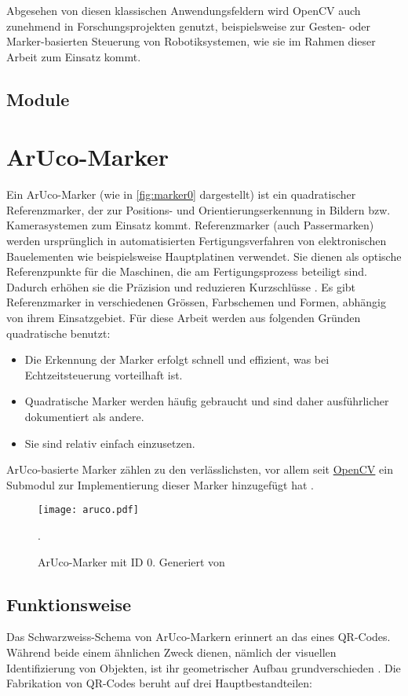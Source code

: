 Abgesehen von diesen klassischen Anwendungsfeldern wird OpenCV auch zunehmend in Forschungsprojekten genutzt, beispielsweise zur Gesten- oder Marker-basierten Steuerung von Robotiksystemen, wie sie im Rahmen dieser Arbeit zum Einsatz kommt. \cite{sse:foodDel}

\subsection{Module}

\section{ArUco-Marker}
Ein ArUco-Marker (wie in \autoref{fig:marker0} dargestellt) ist ein quadratischer Referenzmarker, der zur Positions- und Orientierungserkennung in Bildern bzw. Kamerasystemen zum Einsatz kommt. Referenzmarker (auch Passermarken) werden ursprünglich in automatisierten Fertigungsverfahren von elektronischen Bauelementen wie beispielsweise Hauptplatinen verwendet. Sie dienen als optische Referenzpunkte für die Maschinen, die am Fertigungsprozess beteiligt sind. Dadurch erhöhen sie die Präzision und reduzieren Kurzschlüsse \cite{Wiki:Passermarke}.
Es gibt Referenzmarker in verschiedenen Grössen, Farbschemen und Formen, abhängig von ihrem Einsatzgebiet. Für diese Arbeit werden aus folgenden Gründen quadratische benutzt:

\begin{itemize}
    \item Die Erkennung der Marker erfolgt schnell und effizient, was bei Echtzeitsteuerung vorteilhaft ist.
    \item Quadratische Marker werden häufig gebraucht und sind daher ausführlicher dokumentiert als andere.
    \item Sie sind relativ einfach einzusetzen.
\end{itemize}

ArUco-basierte Marker zählen zu den verlässlichsten, vor allem seit \hyperref[sec:ocv]{OpenCV} ein Submodul zur Implementierung dieser Marker hinzugefügt hat \cite{IJ:fiducial}.

\begin{figure}[H]
    \centering
        \texttt{[image: aruco.pdf]}
    \caption{ArUco-Marker mit ID 0. Generiert von \cite{chev:arucogen}}.
        \label{fig:marker0}
\end{figure}

\subsection{Funktionsweise}
Das Schwarzweiss-Schema von ArUco-Markern erinnert an das eines QR-Codes. Während beide einem ähnlichen Zweck dienen, nämlich der visuellen Identifizierung von Objekten, ist ihr geometrischer Aufbau grundverschieden \cite{ten:qrcode}.
Die Fabrikation von QR-Codes beruht auf drei Hauptbestandteilen:

